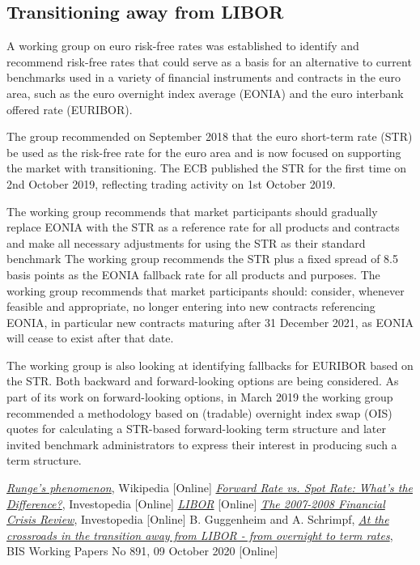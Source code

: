 \subsection{Transitioning away from LIBOR~\cite{bib:str}}
A working group on euro risk-free rates was established to identify
and recommend risk-free rates that could serve as a basis for an
alternative to current benchmarks used in a variety of financial
instruments and contracts in the euro area, such as the euro
overnight index average (EONIA) and the euro interbank offered rate
(EURIBOR). 

The group recommended on September 2018 that the euro
short-term rate (STR) be used as the risk-free rate for the euro area
and is now focused on supporting the market with transitioning.
The ECB published the STR for the first time on 2nd October 2019,
reflecting trading activity on 1st October 2019.

The working group recommends that market participants should gradually replace
EONIA with the STR as a reference rate for all products and
contracts and make all necessary adjustments for using the STR as
their standard benchmark
The working group recommends the STR plus a fixed spread of 8.5
basis points as the EONIA fallback rate for all products and purposes.
The working group recommends that market participants should:
consider, whenever feasible and appropriate, no longer entering into
new contracts referencing EONIA, in particular new contracts
maturing after 31 December 2021, as EONIA will cease to exist after
that date.

The working group is also looking at identifying fallbacks for
EURIBOR based on the STR. Both backward and forward-looking
options are being considered. As part of its work on forward-looking
options, in March 2019 the working group recommended a
methodology based on (tradable) overnight index swap (OIS) quotes
for calculating a STR-based forward-looking term structure and later
invited benchmark administrators to express their interest in
producing such a term structure.

\begin{thebibliography}{9}
	 \href{https://en.wikipedia.org/wiki/Runge\%27s_phenomenon}{\emph{Runge's phenomenon}}, Wikipedia [Online]
	\href{https://www.investopedia.com/ask/answers/042315/what-difference-between-forward-rate-and-spot-rate.asp}{\emph{Forward Rate vs. Spot Rate: What's the Difference?}}, Investopedia [Online]
	 \href{https://www.ig.com/it/glossario-trading/definizione-di-libor}{\emph{LIBOR}} [Online]
	 \href{https://www.investopedia.com/articles/economics/09/financial-crisis-review.asp}{\emph{The 2007-2008 Financial Crisis Review}}, Investopedia [Online]
	B. Guggenheim and A. Schrimpf, 
	\href{https://www.bis.org/publ/work891.htm}{\emph{At the crossroads in the transition away from LIBOR - from overnight to term rates}}, BIS Working Papers No 891, 09 October 2020 [Online]
\end{thebibliography}
